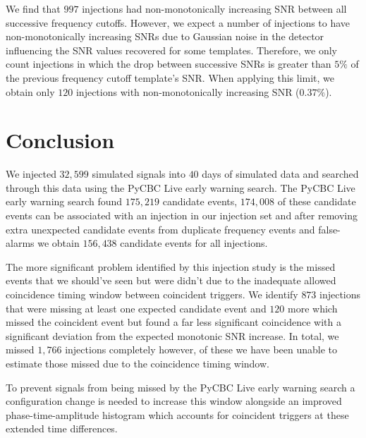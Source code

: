 We find that $997$ injections had non-monotonically increasing SNR between all successive frequency cutoffs. However, we expect a number of injections to have non-monotonically increasing SNRs due to Gaussian noise in the detector influencing the SNR values recovered for some templates. Therefore, we only count injections in which the drop between successive SNRs is greater than $5\%$ of the previous frequency cutoff template's SNR. When applying this limit, we obtain only $120$ injections with non-monotonically increasing SNR ($0.37\%$).


\section{\label{6:sec:conclusion}Conclusion}

We injected $32,599$ simulated \gwadj signals into $40$ days of simulated \gwadj data and searched through this data using the PyCBC Live early warning search. The PyCBC Live early warning search found $175,219$ candidate events, $174,008$ of these candidate events can be associated with an injection in our injection set and after removing extra unexpected candidate events from duplicate frequency events and false-alarms we obtain $156,438$ candidate events for all injections.

The more significant problem identified by this injection study is the missed events that we should've seen but were didn't due to the inadequate allowed coincidence timing window between coincident triggers. We identify $873$ injections that were missing at least one expected candidate event and $120$ more which missed the coincident event but found a far less significant coincidence with a significant deviation from the expected monotonic SNR increase. In total, we missed $1,766$ injections completely however, of these we have been unable to estimate those missed due to the coincidence timing window.

To prevent \gwadj signals from being missed by the PyCBC Live early warning search a configuration change is needed to increase this window alongside an improved phase-time-amplitude histogram which accounts for coincident \gwadj triggers at these extended time differences. 

